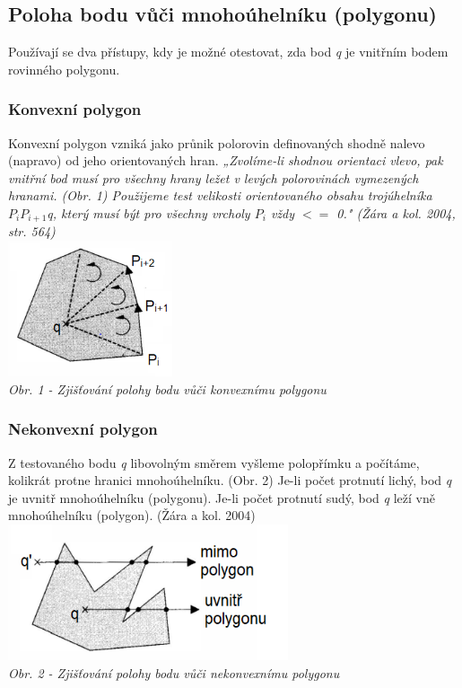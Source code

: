 \documentclass{article}
\begin{document}
\subsection{\small{Poloha bodu vůči mnohoúhelníku (polygonu)}}
Používají se dva přístupy, kdy je možné otestovat, zda bod \emph{q} je vnitřním bodem rovinného polygonu.
\subsubsection{Konvexní polygon}
Konvexní polygon vzniká jako průnik polorovin definovaných shodně nalevo (napravo) od jeho orientovaných hran. \textit{„Zvolíme-li shodnou orientaci vlevo, pak vnitřní bod musí pro všechny hrany ležet v levých  polorovinách vymezených hranami. (Obr. 1) Použijeme test velikosti orientovaného obsahu trojúhelníka $P_{i}P_{i+1}$q, který musí být pro všechny vrcholy $P_{i}$ vždy $<=$ 0." (Žára a kol. 2004, str. 564)} 
\vspace{0.2cm}\\
\includegraphics[height=40mm]{images/q_konvexni.PNG}\bigskip\\
\textit{\footnotesize{Obr. 1 - Zjišťování polohy bodu vůči konvexnímu polygonu}}
\subsubsection{Nekonvexní polygon}
Z testovaného bodu \emph{q} libovolným směrem vyšleme polopřímku a počítáme, kolikrát protne hranici mnohoúhelníku. (Obr. 2) Je-li počet protnutí lichý, bod \emph{q} je uvnitř mnohoúhelníku (polygonu). Je-li počet protnutí sudý, bod \emph{q} leží vně mnohoúhelníku (polygon). (Žára a kol. 2004)
\vspace{0.2cm}\\
\includegraphics[height=40mm]{images/q_nekonvexni.PNG}\bigskip\\
\textit{\footnotesize{Obr. 2 - Zjišťování polohy bodu vůči nekonvexnímu polygonu}}
\end{document}

